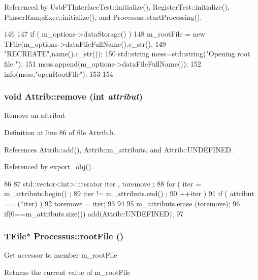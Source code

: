 Referenced by UsbFTInterfaceTest::initialize(), RegisterTest::initialize(), PhaserRampExec::initialize(), and Processus::startProcessing().


\begin{DoxyCode}
146                                {
147   if ( m_options->dataStorage() ){
148     m_rootFile = new TFile(m_options->dataFileFullName().c_str(),
149                            "RECREATE",name().c_str());
150         std::string mess=std::string("Opening root file ");
151         mess.append(m_options->dataFileFullName());
152         info(mess,"openRootFile");
153   }
154 }
\end{DoxyCode}
\hypertarget{classAttrib_a7d4ef7e32d93cb287792b87b857e79f3}{
\subsubsection[{remove}]{\setlength{\rightskip}{0pt plus 5cm}void Attrib::remove (int {\em attribut})}}
\label{classAttrib_a7d4ef7e32d93cb287792b87b857e79f3}
Remove an attribut 

Definition at line 86 of file Attrib.h.

References Attrib::add(), Attrib::m\_\-attributs, and Attrib::UNDEFINED.

Referenced by export\_\-obj().


\begin{DoxyCode}
86                                {
87     std::vector<int>::iterator iter , toremove ;
88     for ( iter  = m_attributs.begin() ;
89           iter != m_attributs.end()   ;
90           ++iter ) {
91       if ( attribut == (*iter) ) {
92         toremove = iter;
93       }
94     }
95     m_attributs.erase (toremove);
96     if(0==m_attributs.size()) add(Attrib::UNDEFINED);
97   }
\end{DoxyCode}
\hypertarget{classProcessus_a247e8c362ec08422cf53d08dd23b093c}{
\subsubsection[{rootFile}]{\setlength{\rightskip}{0pt plus 5cm}TFile$\ast$ Processus::rootFile ()}}
\label{classProcessus_a247e8c362ec08422cf53d08dd23b093c}
Get accessor to member m\_\-rootFile \begin{DoxyReturn}{Returns}
the current value of m\_\-rootFile 
\end{DoxyReturn}


